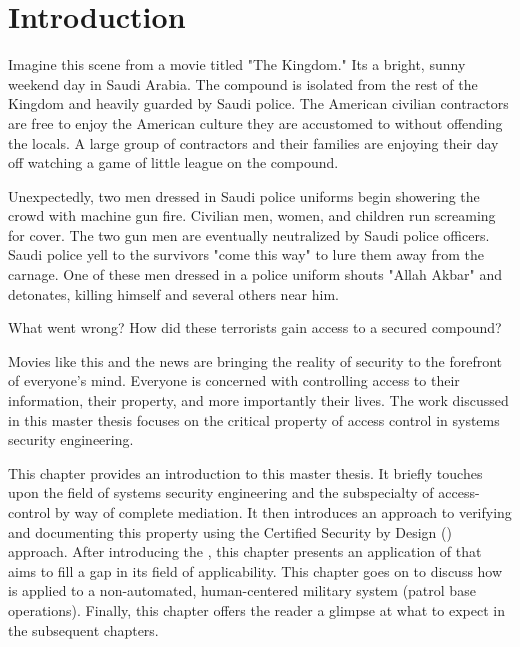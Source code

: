 \documentclass[../../main/main.tex]{subfiles}
\begin{document}
\glsresetall

\chapter{Introduction}
 Imagine this scene from a movie titled "The Kingdom."  Its a bright, sunny weekend day in Saudi Arabia.  The compound is isolated from the rest of the Kingdom and heavily guarded by Saudi police.  The American civilian contractors are free to enjoy the American culture they are accustomed to without offending the locals.  A large group of contractors and their families are enjoying their day off watching a game of little league on the compound.  
 
 
Unexpectedly, two men dressed in Saudi police uniforms begin showering the crowd with machine gun fire.   Civilian men, women, and children run screaming for cover. The two gun men are eventually neutralized by Saudi police officers.  Saudi police yell to the survivors "come this way" to lure them away from the carnage. One of these men dressed in a police uniform shouts "Allah Akbar" and detonates, killing himself and several others near him. 

What went wrong?  How did these terrorists gain access to a secured compound?  

Movies like this and the news are bringing the reality of security to the forefront of everyone's mind.   Everyone is concerned with controlling access to their information, their property, and more importantly their lives.   The work discussed in this master thesis focuses on the critical property of access control in systems security engineering.

This chapter provides an introduction to this master thesis.  It briefly touches upon the field of systems security engineering and the subspecialty of access-control by way of complete mediation.  It then introduces an approach to verifying and documenting this property using the Certified Security by Design () approach.  After introducing the , this chapter presents an application of  that aims to fill a gap in its field of applicability.  This chapter goes on to discuss how  is applied to a non-automated, human-centered military system (patrol base operations).  Finally, this chapter offers the reader a glimpse at what to expect in the subsequent chapters.



\end{document}
